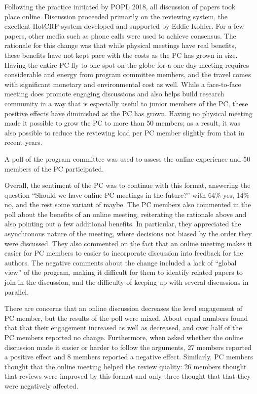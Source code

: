 Following the practice initiated by POPL 2018, all discussion of papers took
place online. Discussion proceeded primarily on the reviewing system, the
excellent HotCRP system developed and supported by Eddie Kohler.  For a few
papers, other media such as phone calls were used to achieve consensus. The
rationale for this change was that while physical meetings have real benefits,
these benefits have not kept pace with the costs as the PC has grown in size.
Having the entire PC fly to one spot on the globe for a one-day meeting
requires considerable and energy from program committee members, and the
travel comes with significant monetary and environmental cost as well. While a
face-to-face meeting does promote engaging discussions and also helps build
research community in a way that is especially useful to junior members of the
PC, these positive effects have diminished as the PC has grown. Having no
physical meeting made it possible to grow the PC to more than 50 members; as a
result, it was also possible to reduce the reviewing load per PC member
slightly from that in recent years.

A poll of the program committee was used to assess the online experience and
50 members of the PC participated. 

Overall, the sentiment of the PC was to continue with this format, answering
the question ``Should we have online PC meetings in the future?'' with 64\%
yes, 14\% no, and the rest some variant of maybe.  The PC members also
commented in the poll about the benefits of an online meeting, reiterating the
rationale above and also pointing out a few additional benefits. In
particular, they appreciated the asynchronous nature of the meeting, where
decisions not biased by the order they were discussed. They also commented on
the fact that an online meeting makes it easier for PC members to easier to
incorporate discussion into feedback for the authors.  The negative comments
about the change included a lack of ``global view'' of the program, making it
difficult for them to identify related papers to join in the discussion, and
the difficulty of keeping up with several discussions in parallel. 

There are concerns that an online discussion decreases the level engagement of
PC member, but the results of the poll were mixed. About equal numbers found
that that their engagement increased as well as decreased, and over half of
the PC members reported no change. Furthermore, when asked whether the online
discussion made it easier or harder to follow the arguments, 27 members
reported a positive effect and 8 members reported a negative effect.
Similarly, PC members thought that the online meeting helped the review
quality: 26 members thought that reviews were improved by this format and
only three thought that that they were negatively affected. 

